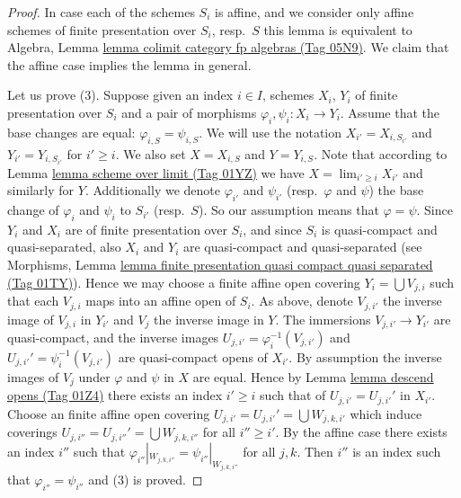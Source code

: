\documentclass{amsart}
\theoremstyle{plain}
\theoremstyle{definition}
\theoremstyle{remark}
\numberwithin{equation}{subsection}
\def\lim{\mathop{\mathrm{lim}}\nolimits}
\begin{document}
\begin{proof}
In case each of the schemes $S_i$ is affine, and we consider
only affine schemes of finite presentation over $S_i$, resp.\ $S$
this lemma is equivalent to
Algebra, Lemma \href{https://stacks.math.columbia.edu/tag/05N9}{lemma colimit category fp algebras (Tag 05N9)}.
We claim that the affine case implies the lemma in general.

\medskip\noindent
Let us prove (3). Suppose given an index $i \in I$, schemes
$X_i$, $Y_i$ of finite presentation over $S_i$ and a pair of morphisms
$\varphi_i, \psi_i : X_i \to Y_i$. Assume that the base changes are
equal: $\varphi_{i, S} = \psi_{i, S}$. We will use the notation
$X_{i'} = X_{i, S_{i'}}$ and $Y_{i'} = Y_{i, S_{i'}}$ for
$i' \geq i$. We also set $X = X_{i, S}$ and $Y = Y_{i, S}$.
Note that according to Lemma \href{https://stacks.math.columbia.edu/tag/01YZ}{lemma scheme over limit (Tag 01YZ)} we have
$X = \lim_{i' \geq i} X_{i'}$ and similarly for $Y$.
Additionally we denote $\varphi_{i'}$ and $\psi_{i'}$
(resp.\ $\varphi$ and $\psi$)
the base change of $\varphi_i$ and $\psi_i$ to $S_{i'}$
(resp.\ $S$). So our assumption means that $\varphi = \psi$.
Since $Y_i$ and $X_i$ are of finite presentation
over $S_i$, and since $S_i$ is quasi-compact and quasi-separated, also
$X_i$ and $Y_i$ are quasi-compact and quasi-separated
(see Morphisms,
Lemma \href{https://stacks.math.columbia.edu/tag/01TY}{lemma finite presentation quasi compact quasi separated (Tag 01TY)}).
Hence we may choose a finite affine open covering
$Y_i = \bigcup V_{j, i}$ such that each $V_{j, i}$ maps into
an affine open of $S_i$. As above, denote $V_{j, i'}$ the inverse
image of $V_{j, i}$ in $Y_{i'}$ and $V_j$ the inverse image in $Y$.
The immersions $V_{j, i'} \to Y_{i'}$ are quasi-compact, and the inverse images
$U_{j, i'} = \varphi_i^{-1}(V_{j, i'})$ and
$U_{j, i'}' = \psi_i^{-1}(V_{j, i'})$
are quasi-compact opens of $X_{i'}$. By assumption the inverse images of
$V_j$ under $\varphi$ and $\psi$ in $X$ are equal.
Hence by Lemma \href{https://stacks.math.columbia.edu/tag/01Z4}{lemma descend opens (Tag 01Z4)}
there exists an index $i' \geq i$ such that
of $U_{j, i'} = U_{j, i'}'$ in $X_{i'}$.
Choose an finite affine open covering
$U_{j, i'} = U_{j, i'}' = \bigcup W_{j, k, i'}$
which induce coverings $U_{j, i''} = U_{j, i''}' = \bigcup W_{j, k, i''}$
for all $i'' \geq i'$.
By the affine case there exists
an index $i''$ such that
$\varphi_{i''}|_{W_{j, k, i''}} = \psi_{i''}|_{W_{j, k, i''}}$
for all $j, k$. Then $i''$ is an index such that
$\varphi_{i''} = \psi_{i''}$ and (3) is proved.


\end{proof}
\end{document}
